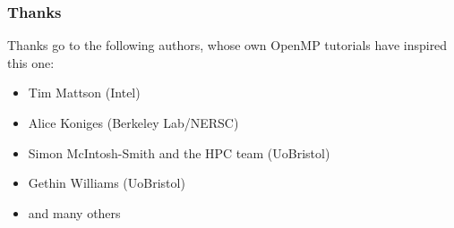 \documentclass{beamer}
\begin{document}
\begin{frame}
\frametitle{Thanks}
Thanks go to the following authors, whose own OpenMP tutorials have inspired this one:
\begin{itemize}
  \item Tim Mattson (Intel)
  \item Alice Koniges (Berkeley Lab/NERSC)
  \item Simon McIntosh-Smith and the HPC team (UoBristol)
  \item Gethin Williams (UoBristol)
  \item and many others
\end{itemize}
\end{frame}
\end{document}

